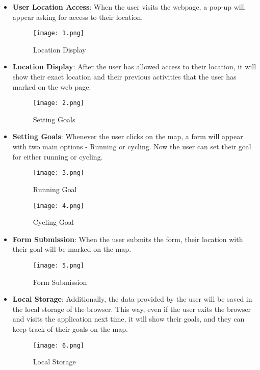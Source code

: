 \documentclass{article}
\begin{document}
\begin{itemize}
  \item \textbf{User Location Access}: When the user visits the webpage, a pop-up will appear asking for access to their location.


\begin{figure}
  \centering
  \texttt{[image: 1.png]}
  \caption{Location Display}
  \label{fig:sample}
\end{figure}

  \item \textbf{Location Display}: After the user has allowed access to their location, it will show their exact location and their previous activities that the user has marked on the web page.

\begin{figure}
  \centering
  \texttt{[image: 2.png]}
  \caption{Setting Goals}
  \label{fig:sample}
\end{figure}


  \item \textbf{Setting Goals}: Whenever the user clicks on the map, a form will appear with two main options - Running or cycling. Now the user can set their goal for either running or cycling.

\begin{figure}
  \centering
  \texttt{[image: 3.png]}
  \caption{Running Goal}
  \label{fig:sample}
\end{figure}

\begin{figure}
  \centering
  \texttt{[image: 4.png]}
  \caption{Cycling Goal}
  \label{fig:sample}
\end{figure}

  \item \textbf{Form Submission}: When the user submits the form, their location with their goal will be marked on the map.


\begin{figure}
  \centering
  \texttt{[image: 5.png]}
  \caption{Form Submission}
  \label{fig:sample}
\end{figure}
  \item \textbf{Local Storage}: Additionally, the data provided by the user will be saved in the local storage of the browser. This way, even if the user exits the browser and visits the application next time, it will show their goals, and they can keep track of their goals on the map.
\begin{figure}
  \centering
  \texttt{[image: 6.png]}
  \caption{Local Storage}
  \label{fig:sample}
\end{figure}
\end{itemize}
\end{document}
